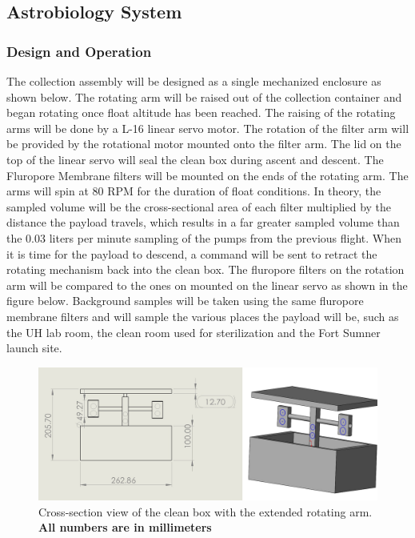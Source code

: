 \subsection{Astrobiology System}
\label{sec:AstrobiologySystem}

\subsubsection{Design and Operation}
The collection assembly will be designed as a single mechanized enclosure as shown below. The rotating arm will be raised out of the collection container and began rotating once float altitude has been reached. The raising of the rotating arms will be done by a L-16 linear servo motor. The rotation of the filter arm will be provided by the rotational motor mounted onto the filter arm. The lid on the top of the linear servo will seal the clean box during ascent and descent. The  Fluropore Membrane filters will be mounted on the ends of the rotating arm. The arms will spin at 80 RPM for the duration of float conditions. In theory, the sampled volume will be the cross-sectional area of each filter multiplied by the distance the payload travels, which results in a far greater sampled volume than the 0.03 liters per minute sampling of the pumps from the previous flight.\cite{SORA2} When it is time for the payload to descend, a command will be sent to retract the rotating mechanism back into the clean box. The fluropore filters on the rotation arm will be compared to the ones on mounted on the linear servo as shown in the figure below. Background samples will be taken using the same fluropore membrane filters and will sample the various places the payload will be, such as the UH lab room, the clean room used for sterilization and the Fort Sumner launch site. 

\begin{figure}[!h] 
	\begin{center}
		\includegraphics[width=\linewidth]{Figures/T-Arm.jpg}
		\caption{Cross-section view of the clean box with the extended rotating arm. \bf All numbers are in millimeters}
		\label{fig:AstroBox}
	\end{center}
\end{figure} 

